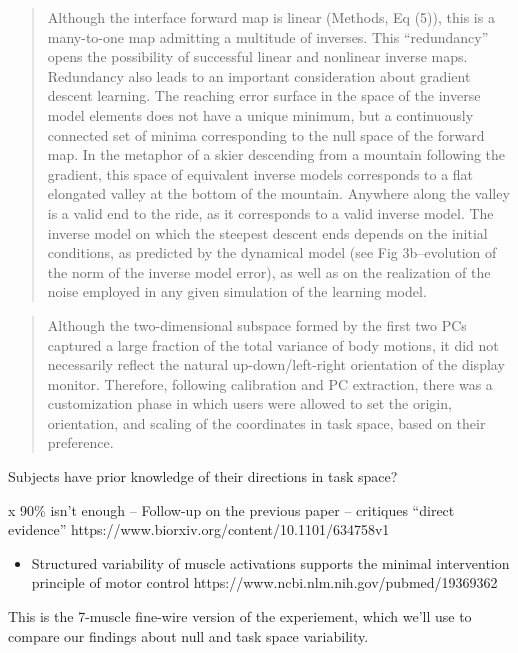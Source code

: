 \documentclass[../main.tex]{subfiles}
\begin{document}
\begin{quote}
Although the interface forward map is linear (Methods, Eq (5)), this is a many-to-one map admitting a multitude of inverses. This ``redundancy'' opens the possibility of successful linear and nonlinear inverse maps. Redundancy also leads to an important consideration about gradient descent learning. The reaching error surface in the space of the inverse model elements does not have a unique minimum, but a continuously connected set of minima corresponding to the null space of the forward map. In the metaphor of a skier descending from a mountain following the gradient, this space of equivalent inverse models corresponds to a flat elongated valley at the bottom of the mountain. Anywhere along the valley is a valid end to the ride, as it corresponds to a valid inverse model. The inverse model on which the steepest descent ends depends on the initial conditions, as predicted by the dynamical model (see Fig 3b--evolution of the norm of the inverse model error), as well as on the realization of the noise employed in any given simulation of the learning model.
\end{quote}

\begin{quote}
Although the two-dimensional subspace formed by the first two PCs captured a large fraction of the total variance of body motions, it did not necessarily reflect the natural up-down/left-right orientation of the display monitor. Therefore, following calibration and PC extraction, there was a customization phase in which users were allowed to set the origin, orientation, and scaling of the coordinates in task space, based on their preference.
\end{quote}

Subjects have prior knowledge of their directions in task space?

x 90\% isn't enough -- Follow-up on the previous paper -- critiques ``direct evidence'' https://www.biorxiv.org/content/10.1101/634758v1

\begin{itemize}
\item
  Structured variability of muscle activations supports the minimal intervention principle of motor control https://www.ncbi.nlm.nih.gov/pubmed/19369362
\end{itemize}

This is the 7-muscle fine-wire version of the experiement, which we'll use to compare our findings about null and task space variability.


\end{document}
